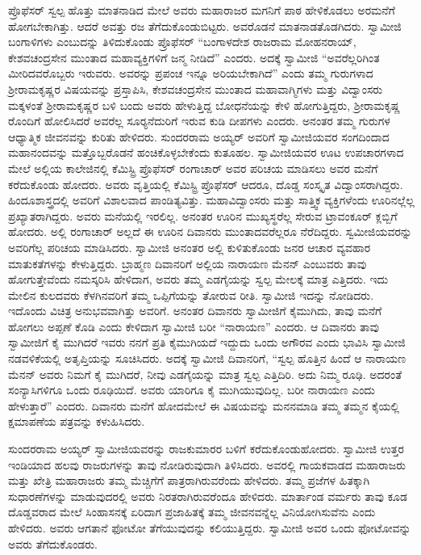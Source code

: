  ಪ್ರೊಫೆಸರ್ ಸ್ವಲ್ಪ ಹೊತ್ತು ಮಾತನಾಡಿದ ಮೇಲೆ ಅವರು ಮಹಾರಾಜರ ಮಗನಿಗೆ ಪಾಠ ಹೇಳಿಕೊಡಲು ಅರಮನೆಗೆ ಹೋಗಬೇಕಾಗಿತ್ತು. ಆದರೆ ಅವತ್ತು ರಜ ತೆಗೆದುಕೊಂಡುಬಿಟ್ಟರು. ಅವರೊಡನೆ ಮಾತನಾಡತೊಡಗಿದರು. ಸ್ವಾಮೀಜಿ ಬಂಗಾಳಿಗಳು ಎಂಬುದನ್ನು ತಿಳಿದುಕೊಂಡು ಪ್ರೊಫೆಸರ್ “ಬಂಗಾಳದೇಶ ರಾಜರಾಮ ಮೋಹನರಾಯ್, ಕೇಶವಚಂದ್ರಸೇನ ಮುಂತಾದ ಮಹಾವ್ಯಕ್ತಿಗಳಿಗೆ ಜನ್ಮ ನೀಡಿದೆ” ಎಂದರು. ಅದಕ್ಕೆ ಸ್ವಾಮೀಜಿ “ಅವರೆಲ್ಲರಿಗಿಂತ ಮೀರಿದವರೊಬ್ಬರು ಇರುವರು. ಅವರನ್ನು ಪ್ರಪಂಚ ಇನ್ನೂ ಅರಿಯಬೇಕಾಗಿದೆ” ಎಂದು ತಮ್ಮ ಗುರುಗಳಾದ ಶ‍್ರೀರಾಮಕೃಷ್ಣರ ವಿಷಯವನ್ನು ಪ್ರಸ್ತಾಪಿಸಿ, ಕೇಶವಚಂದ್ರಸೇನ ಮುಂತಾದ ಮಹಾವಾಗ್ಮಿಗಳು ಮತ್ತು ವಿದ್ವಾಂಸರು ಮಕ್ಕಳಂತೆ ಶ‍್ರೀರಾಮಕೃಷ್ಣರ ಬಳಿ ಬಂದು ಅವರು ಹೇಳುತ್ತಿದ್ದ ಬೋಧನೆಯನ್ನು ಕೇಳಿ ಹೋಗುತ್ತಿದ್ದರು, ಶ‍್ರೀರಾಮಕೃಷ್ಣ ರೊಂದಿಗೆ ಹೋಲಿಸಿದರೆ ಅವರೆಲ್ಲ ಸೂರ‍್ಯನೆದುರಿಗೆ ಇರುವ ಕುಡಿ ದೀಪಗಳು ಎಂದರು. ಅನಂತರ ತಮ್ಮ ಗುರುಗಳ ಆಧ್ಯಾತ್ಮಿಕ ಜೀವನವನ್ನು ಕುರಿತು ಹೇಳಿದರು. ಸುಂದರರಾಮ ಅಯ್ಯರ್ ಅವರಿಗೆ ಸ್ವಾಮೀಜಿಯವರ ಸಂಗದಿಂದಾದ ಮಹಾನಂದವನ್ನು ಮತ್ತೊಬ್ಬರೊಡನೆ ಹಂಚಿಕೊಳ್ಳಬೇಕೆಂದು ಕುತೂಹಲ. ಸ್ವಾಮೀಜಿಯವರ ಊಟ ಉಪಚಾರಗಳಾದ ಮೇಲೆ ಅಲ್ಲಿಯ ಕಾಲೇಜಿನಲ್ಲಿ ಕೆಮಿಸ್ಟ್ರಿ ಪ್ರೊಫೆಸರ್ ರಂಗಾಚಾರ್ ಅವರ ಪರಿಚಯ ಮಾಡಿಸಲು ಅವರ ಮನೆಗೆ ಕರೆದುಕೊಂಡು ಹೋದರು. ಅವರು ವೃತ್ತಿಯಲ್ಲಿ ಕೆಮಿಸ್ಟ್ರಿ ಪ್ರೊಫೆಸರ್ ಆದರೂ, ದೊಡ್ಡ ಸಂಸ್ಕೃತ ವಿದ್ವಾಂಸರಾಗಿದ್ದರು. ಹಿಂದೂಶಾಸ್ತ್ರದಲ್ಲಿ ಅವರಿಗೆ ವಿಶಾಲವಾದ ಪಾಂಡಿತ್ಯವಿತ್ತು. ಮಹಾವಿದ್ವಾಂಸರು ಮತ್ತು ಸಾತ್ತ್ವಿಕ ವ್ಯಕ್ತಿಗಳೆಂದು ಊರಿನಲ್ಲೆಲ್ಲ ಪ್ರಖ್ಯಾತರಾಗಿದ್ದರು. ಅವರು ಮನೆಯಲ್ಲಿ ಇರಲಿಲ್ಲ. ಅನಂತರ ಊರಿನ ಮುಖ್ಯಸ್ಥರೆಲ್ಲ ಸೇರುವ ಟ್ರಾವಂಕೂರ್ ಕ್ಲಬ್ಬಿಗೆ ಹೋದರು. ಅಲ್ಲಿ ರಂಗಾಚಾರ್ ಅಲ್ಲದೆ ಈ ಊರಿನ ದಿವಾನರು ಮುಂತಾದವರೆಲ್ಲರೂ ನೆರೆದಿದ್ದರು. ಸ್ವಮೀಜಿಯವರನ್ನು ಅವರಿಗೆಲ್ಲ ಪರಿಚಯ ಮಾಡಿಸಿದರು. ಸ್ವಾಮೀಜಿ ಅನಂತರ ಅಲ್ಲಿ ಕುಳಿತುಕೊಂಡು ಜನರ ಆಚಾರ ವ್ಯವಹಾರ ಮಾತುಕತೆಗಳನ್ನು ಕೇಳುತ್ತಿದ್ದರು. ಬ್ರಾಹ್ಮಣ ದಿವಾನರಿಗೆ ಅಲ್ಲಿಯ ನಾರಾಯಣ ಮೆನನ್ ಎಂಬುವರು ತಾವು ಹೋಗುತ್ತೇವೆಂದು ನಮಸ್ಕರಿಸಿ ಹೇಳಿದಾಗ, ಅವರು ತಮ್ಮ ಎಡಗೈಯನ್ನು ಸ್ವಲ್ಪ ಮೇಲಕ್ಕೆ ಮಾತ್ರ ಎತ್ತಿದರು. ಇದು ಮೇಲಿನ ಕುಲದವರು ಕೆಳಗಿನವರಿಗೆ ತಮ್ಮ ಒಪ್ಪಿಗೆಯನ್ನು ತೋರುವ ರೀತಿ. ಸ್ವಾಮೀಜಿ ಇದನ್ನು ನೋಡಿದರು. ಇದೊಂದು ವಿಚಿತ್ರ ಅನುಭವವಾಗಿತ್ತು ಅವರಿಗೆ. ಅನಂತರ ದಿವಾನರು ಸ್ವಾಮೀಜಿಗೆ ಕೈಮುಗಿದು, ತಾವು ಮನೆಗೆ ಹೋಗಲು ಅಪ್ಪಣೆ ಕೊಡಿ ಎಂದು ಕೇಳಿದಾಗ ಸ್ವಾಮೀಜಿ ಬರೀ “ನಾರಾಯಣ” ಎಂದರು. ಆ ದಿವಾನರು ತಾವು ಸ್ವಾಮೀಜಿಗೆ ಕೈ ಮುಗಿದರೆ ಇವರು ನನಗೆ ಪ್ರತಿ ಕೈಮುಗಿಯದೆ ಇದ್ದುದು ಒಂದು ಅಗೌರವ ಎಂದು ಭಾವಿಸಿ ಸ್ವಾಮೀಜಿ ನಡವಳಿಕೆಯಲ್ಲಿ ಅತೃಪ್ತಿಯನ್ನು ಸೂಚಿಸಿದರು. ಅದಕ್ಕೆ ಸ್ವಾಮೀಜಿ ದಿವಾನರಿಗೆ, “ಸ್ವಲ್ಪ ಹೊತ್ತಿನ ಹಿಂದೆ ಆ ನಾರಾಯಣ ಮೆನನ್ ಅವರು ನಿಮಗೆ ಕೈ ಮುಗಿದರೆ, ನೀವು ಎಡಗೈಯನ್ನು ಮಾತ್ರ ಸ್ವಲ್ಪ ಎತ್ತಿದಿರಿ. ಅದು ನಿಮ್ಮ ರೂಢಿ. ಅದರಂತೆ ಸಂನ್ಯಾಸಿಗಳಿಗೂ ಒಂದು ರೂಢಿಯಿದೆ. ಅವರು ಯಾರಿಗೂ ಕೈ ಮುಗಿಯುವುದಿಲ್ಲ. ಬರೀ ನಾರಾಯಣ ಎಂದು ಹೇಳುತ್ತಾರೆ” ಎಂದರು. ದಿವಾನರು ಮನೆಗೆ ಹೋದಮೇಲೆ ಈ ವಿಷಯವನ್ನು ಮನನಮಾಡಿ ತಮ್ಮ ತಮ್ಮನ ಕೈಯಲ್ಲಿ ಕ್ಷಮಾಪಣೆಯ ಪತ್ರವನ್ನು ಕಳುಹಿಸಿದರು. 

 ಸುಂದರರಾಮ ಅಯ್ಯರ್ ಸ್ವಾಮೀಜಿಯವರನ್ನು ರಾಜಕುಮಾರರ ಬಳಿಗೆ ಕರೆದುಕೊಂಡುಹೋದರು. ಸ್ವಾಮೀಜಿ ಉತ್ತರ ಇಂಡಿಯಾದ ಹಲವು ರಾಜರುಗಳನ್ನು ತಾವು ನೋಡಿರುವುದಾಗಿ ತಿಳಿಸಿದರು. ಅವರಲ್ಲಿ ಗಾಯಕವಾಡದ ಮಹಾರಾಜರು ಮತ್ತು ಖೇತ್ರಿ ಮಹಾರಾಜರು ತಮ್ಮ ಮೆಚ್ಚಿಗೆಗೆ ಪಾತ್ರರಾಗಿರುವರೆಂದು ಹೇಳಿದರು. ತಮ್ಮ ಪ್ರಜೆಗಳ ಹಿತಕ್ಕಾಗಿ ಸುಧಾರಣೆಗಳನ್ನು ಮಾಡುವುದರಲ್ಲಿ ಅವರು ನಿರತರಾಗಿರುವರೆಂದೂ ಹೇಳಿದರು. ಮಾರ್ತಾಂಡ ವರ್ಮರು ತಾವು ಕೂಡ ದೊಡ್ಡವರಾದ ಮೇಲೆ ಸಿಂಹಾಸನಕ್ಕೆ ಏರಿದಾಗ ಪ್ರಜಾಹಿತಕ್ಕೆ ತಮ್ಮ ಜೀವನವನ್ನೆಲ್ಲ ವಿನಿಯೋಗಿಸುವೆನು ಎಂದು ಹೇಳಿದರು. ಅವರು ಆಗತಾನೆ ಫೋಟೋ ತೆಗೆಯುವುದನ್ನು ಕಲಿಯುತ್ತಿದ್ದರು. ಸ್ವಾಮೀಜಿ ಅವರ ಒಂದು ಫೋಟೋವನ್ನು ಅವರು ತೆಗೆದುಕೊಂಡರು. 

